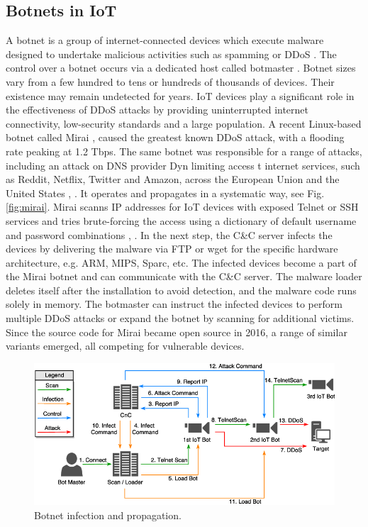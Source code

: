 \documentclass[conference, 11pt]{IEEEtran}
\begin{document}
    \subsection{Botnets in IoT}
    A botnet is a group of internet-connected devices which execute malware designed to undertake malicious activities such as spamming or DDoS \cite{article:6}.
    The control over a botnet occurs via a dedicated host called botmaster \cite{article:6}.
    Botnet sizes vary from a few hundred to tens or hundreds of thousands of devices.
    Their existence may remain undetected for years.
    IoT devices play a significant role in the effectiveness of DDoS attacks by providing uninterrupted internet connectivity, low-security standards and a large population.
    A recent Linux-based botnet called Mirai \cite{article:16}, \cite{article:6} caused the greatest known DDoS attack, with a flooding rate peaking at 1.2 Tbps.
    The same botnet was responsible for a range of attacks, including an attack on DNS provider Dyn limiting access t internet services, such as Reddit, Netflix, Twitter and Amazon, across the European Union and the United States \cite{article:8}, \cite{article:16}.
    It operates and propagates in a systematic way, see Fig. \ref{fig:mirai}.
    Mirai scanns IP addresses for IoT devices with exposed Telnet or SSH services and tries brute-forcing the access using a dictionary of default username and password combinations \cite{article:8}, \cite{article:6}.
    In the next step, the C\&C server infects the devices by delivering the malware via FTP or wget for the specific hardware architecture, e.g. ARM, MIPS, Sparc, etc.
    The infected devices become a part of the Mirai botnet and can communicate with the C\&C server.
    The malware loader deletes itself after the installation to avoid detection, and the malware code runs solely in memory.
    The botmaster can instruct the infected devices to perform multiple DDoS attacks or expand the botnet by scanning for additional victims.
    Since the source code for Mirai became open source in 2016, a range of similar variants emerged, all competing for vulnerable devices.

    \begin{figure}[htbp]
        \centerline{\includegraphics[width=\linewidth]{figures/botnet.png}}
        \caption{Botnet infection and propagation. \cite{article:15}}
        \label{fig1}
    \end{figure}
\end{document}
